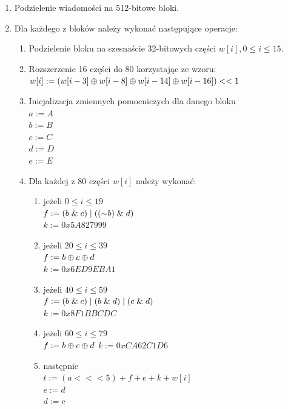 \begin{enumerate}
\begin{enumerate}
{					00000000 00000000 00000000 00000000 \\ 
					00000000 00000000 00000000 00000031 }
		\end{enumerate}
	\item Podzielenie wiadomości na 512-bitowe bloki.
	\item Dla każdego z bloków należy wykonać następujące operacje:
		\begin{enumerate}
			\item Podzielenie bloku na szesnaście 32-bitowych części $w[i], 0 \leq i \leq 15$.
			\item Rozszerzenie 16 części do 80 korzystając ze wzoru: \\
				$w[i] := (w[i-3] \mathbin{\oplus} w[i-8] \mathbin{\oplus} w[i-14] \mathbin{\oplus} w[i-16]) << 1$
			\item Inicjalizacja zmiennych pomocniczych dla danego bloku \\
				$a := A$ \\
				$b := B$ \\
				$c := C$ \\
				$d := D$ \\
				$e := E$ 
			\item Dla każdej z 80 części $w[i]$ należy wykonać:
				\begin{enumerate}
					\item jeżeli $0 \leq i \leq 19$ \\
			        	$f := (b \mathrel{\&} c) \mathrel{|} ((\mathord{\sim} b) \mathrel{\&} d)$ \\
			            $k := 0x5A827999$
					\item jeżeli $20 \leq i \leq 39$ \\
           				$f := b \mathbin{\oplus} c \mathbin{\oplus} d$ \\
          				$k := 0x6ED9EBA1$
				    \item jeżeli $40 \leq i \leq 59$ \\
			        	$f := (b \mathrel{\&} c) \mathrel{|} (b \mathrel{\&} d) \mathrel{|} (c \mathrel{\&} d)$ \\
           				$k := 0x8F1BBCDC$
        			\item jeżeli $60 \leq i \leq 79$ \\
			            $f := b \mathbin{\oplus} c \mathbin{\oplus} d$
   	        			$k := 0xCA62C1D6$
            		\item następnie \\
           				$t := (a <<< 5) + f + e + k + w[i]$ \\
				        $e := d$ \\
				        $d := c$\\

\end{enumerate}
\end{enumerate}
\end{enumerate}
